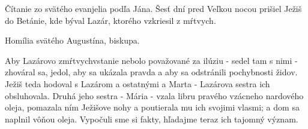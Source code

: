Čítanie zo svätého evanjelia podľa Jána.
Šesť dní pred Veľkou nocou prišiel Ježiš do Betánie, kde býval Lazár, ktorého vzkriesil z mŕtvych.

Homília svätého Augustína, biskupa.

Aby Lazárovo zmŕtvychvstanie nebolo považované za ilúziu - sedel tam s nimi - zhováral sa, jedol, aby sa ukázala pravda a aby sa odstránili pochybnosti židov. Ježiš teda hodoval s Lazárom a ostatnými a Marta - Lazárova sestra ich obsluhovala. Druhá jeho sestra - Mária - vzala libru pravého vzácneho nardového oleja, pomazala ním Ježišove nohy a poutierala mu ich svojimi vlasmi; a dom sa naplnil vôňou oleja.
Vypočuli sme si fakty, hľadajme teraz ich tajomný význam.


